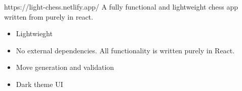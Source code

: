 \begin{experience}[last]{https://light-chess.netlify.app/}{
}
A fully functional and lightweight chess app written from purely in react.

\begin{itemize}
 	\item Lightwieght
 	\item No external dependencies. All functionality is written purely in React.
 	\item Move generation and validation
 	\item Dark theme UI
\end{itemize}

\end{experience}


